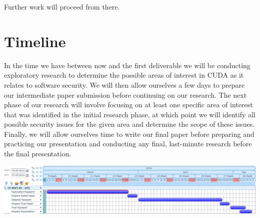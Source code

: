 \documentclass[letterpaper,10pt]{article}
\begin{document}
Further work will proceed from there.

\section{Timeline}
In the time we have between now and the first deliverable we will be conducting exploratory research to determine the possible areas of interest in CUDA as it relates to software security. We will then allow ourselves a few days to prepare our intermediate paper submission before continuing on our research. The next phase of our research will involve focusing on at least one specific area of interest that was identified in the initial research phase, at which point we will identify all possible security issues for the given area and determine the scope of these issues. Finally, we will allow ourselves time to write our final paper before preparing and practicing our presentation and conducting any final, last-minute research before the final presentation.

\includegraphics[width=\columnwidth]{texobjs/dstvt2g_6d5trvxfm_b.jpg}
\end{document}
